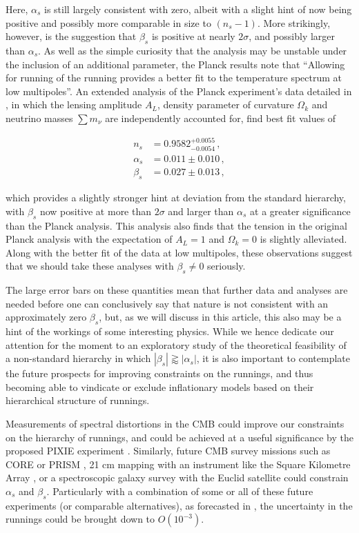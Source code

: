 \documentclass[universe,preprints,oneauthor,pdftex,10pt,a4paper]{mdpi}
\begin{document}
Here, $\alpha_s$ is still largely consistent with zero, albeit with a slight hint of now being positive and possibly more comparable in size to $(n_s - 1)$. More strikingly, however, is the suggestion that $\beta_s$ is positive at nearly $2 \sigma$, and possibly larger than $\alpha_s$. As well as the simple curiosity that the analysis may be unstable under the inclusion of an additional parameter, the Planck results note that ``Allowing for running of the running provides a better fit to the temperature spectrum at low multipoles''. An extended analysis of the Planck experiment's data detailed in \cite{Cabass:2016ldu}, in which the lensing amplitude $A_L$, density parameter of curvature $\Omega_k$ and neutrino masses $\sum m_\nu$ are independently accounted for, find best fit values of

\begin{align}
n_s & = 0.9582^{+0.0055}_{-0.0054}\, , \\ 
\alpha_s & = 0.011 \pm 0.010\, , \\
\beta_s & = 0.027 \pm 0.013 \, ,
\end{align}

which provides a slightly stronger hint at deviation from the standard hierarchy, with $\beta_s$ now positive at more than $2 \sigma$ and larger than $\alpha_s$ at a greater significance than the Planck analysis. This analysis also finds that the tension in the original Planck analysis with the expectation of $A_L = 1$ and $\Omega_k = 0$ is slightly alleviated. Along with the better fit of the data at low multipoles, these observations suggest that we should take these analyses with $\beta_s \neq 0$ seriously.

The large error bars on these quantities mean that further data and analyses are needed before one can conclusively say that nature is not consistent with an approximately zero $\beta_s$, but, as we will discuss in this article, this also may be a hint of the workings of some interesting physics. While we hence dedicate our attention for the moment to an exploratory study of the theoretical feasibility of a non-standard hierarchy in which $|\beta_s| \gtrapprox |\alpha_s|$, it is also important to contemplate the future prospects for improving constraints on the runnings, and thus becoming able to vindicate or exclude inflationary models based on their hierarchical structure of runnings.
 
Measurements of spectral distortions in the CMB could improve our constraints on the hierarchy of runnings, and could be achieved at a useful significance by the proposed PIXIE experiment \cite{Cabass:2016giw,Chluba:2016bvg,Chluba:2015bqa,Kogut2011}. Similarly, future CMB survey missions such as CORE \cite{DiValentino:2016foa,Finelli:2016cyd} or PRISM \cite{Andre:2013nfa}, 21 cm mapping \cite{Battye:2004re} with an instrument like the Square Kilometre Array \cite{Maartens:2015mra}, or a spectroscopic galaxy survey with the Euclid satellite \cite{Amendola:2016saw} could constrain $\alpha_s$ and $\beta_s$. Particularly with a combination of some or all of these future experiments (or comparable alternatives), as forecasted in \cite{Pourtsidou:2016ctq}, the uncertainty in the runnings could be brought down to $O(10^{-3})$.
 
\end{document}
